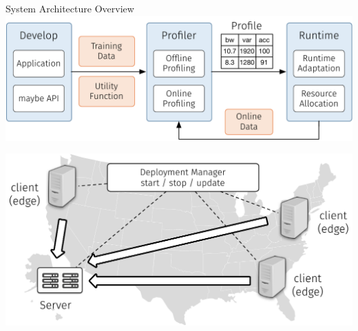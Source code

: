 \begin{frame}{System Architecture Overview}
  \centering
  \includegraphics[width=0.8\linewidth]{figures/arch.pdf}\\
  \centering
  \includegraphics[width=0.7\linewidth]{figures/arch-2.pdf}
\end{frame}






